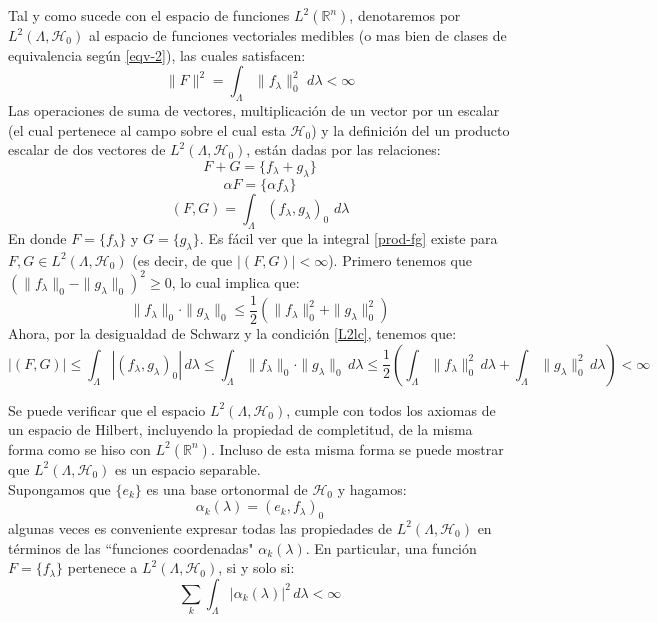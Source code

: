 \documentclass[12pt]{book}
\numberwithin{equation}{chapter}
\def\R{\mathbb{R}}
\def\H{\mathcal{H}}
\begin{document}
Tal y como sucede con el espacio de funciones $L^{2}(\R^{n})$, denotaremos por $L^{2}( \Lambda , \H_{0} )$ al espacio de funciones vectoriales medibles (o mas bien de clases de equivalencia seg\'un \eqref{eqv-2}), las cuales satisfacen:
\begin{equation}\label{L2lc}
\| F \|^{2} = \int_{\Lambda} \| f_{\lambda} \|_{0}^{2} \,\, d\lambda < \infty 
\end{equation}
Las operaciones de suma de vectores, multiplicaci\'on de un vector por un escalar (el cual pertenece al campo sobre el cual esta $\H_{0}$) y la definici\'on del un producto escalar de dos vectores de $L^{2}(\Lambda , \H_{0})$, est\'an dadas por las relaciones:
\begin{equation}
F+G= \{ f_{\lambda} + g_{\lambda} \}
\end{equation}
\begin{equation}
\alpha F = \{ \alpha f_{\lambda} \}
\end{equation}
\begin{equation}\label{prod-fg}
(F,G)= \int_{\Lambda} ( f_{\lambda},g_{\lambda} )_{0} \,\, d\lambda
\end{equation} 
En donde $F=\{ f_{\lambda} \}$ y $G=\{ g_{\lambda} \}$. Es f\'acil ver que la integral \eqref{prod-fg} existe para $F,G \in L^{2}(\Lambda,\H_{0})$ (es decir, de que $|(F,G)| < \infty$). Primero tenemos que $ ( \|f_{\lambda}\|_{0} - \|g_{\lambda}\|_{0}  )^{2} \geq 0 $, lo cual implica que:
$$ \|f_{\lambda}\|_{0} \cdot \|g_{\lambda}\|_{0} \leq \frac{1}{2} \left( \|f_{\lambda}\|_{0}^{2} + \|g_{\lambda}\|_{0}^{2} \right) $$
Ahora, por la desigualdad de Schwarz y la condici\'on \eqref{L2lc}, tenemos que:
$$ |(F,G)| \leq \int_{\Lambda} |( f_{\lambda},g_{\lambda} )_{0}|\, d \lambda \leq \int_{\Lambda} \|f_{\lambda}\|_{0} \cdot \|g_{\lambda}\|_{0}\, d \lambda \leq \frac{1}{2} \left( \int_{\Lambda} \|f_{\lambda}\|_{0}^{2} \, d \lambda + \int_{\Lambda} \|g_{\lambda}\|_{0}^{2} \, d \lambda \right) < \infty  $$

Se puede verificar que el espacio $L^{2}(\Lambda , \H_{0})$, cumple con todos los axiomas de un espacio de Hilbert, incluyendo la propiedad de completitud, de la misma forma como se hiso con $L^{2}(\R^{n})$. Incluso de esta misma forma se puede mostrar que $L^{2}(\Lambda , \H_{0})$ es un espacio separable. \\

Supongamos que $\{ e_{k} \}$ es una base ortonormal de $\H_{0}$ y hagamos:
\begin{equation}
\alpha_{k} (\lambda) = (e_{k},f_{\lambda})_{0}
\end{equation}
algunas veces es conveniente expresar todas las propiedades de $L^{2}(\Lambda ,\H_{0})$ en t\'erminos de las ``funciones coordenadas" $\alpha_{k} (\lambda)$. En particular, una funci\'on $F=\{ f_{\lambda} \}$ pertenece a $L^{2}(\Lambda ,\H_{0})$, si y solo si:
\begin{equation}
\sum_{k} \int_{\Lambda} | \alpha_{k}(\lambda) |^{2}\, d\lambda < \infty
\end{equation}
\end{document}
